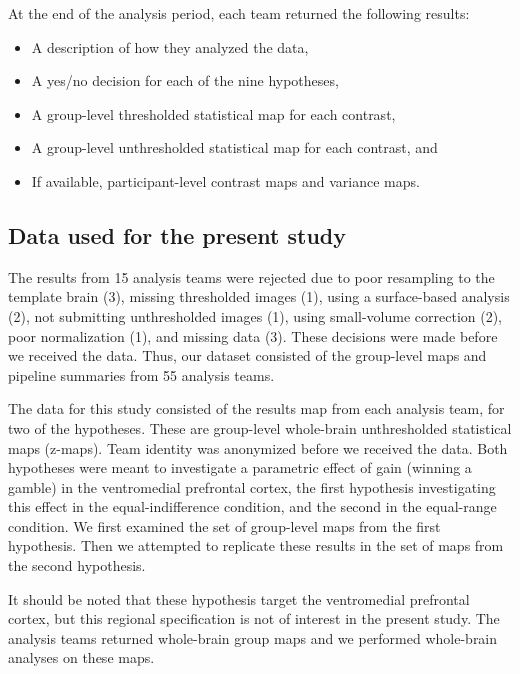 \documentclass[a4paper,doc,natbib]{apa6}
\begin{document}
At the end of the analysis period, each team returned the following results:
\begin{itemize}
	\item A description of how they analyzed the data,
	\item A yes/no decision for each of the nine hypotheses, 
	\item A group-level thresholded statistical map for each contrast, 
	\item A group-level unthresholded statistical map for each contrast, and
	\item If available, participant-level contrast maps and variance maps. 
\end{itemize}

\subsection{Data used for the present study}
The results from 15 analysis teams were rejected due to poor resampling to the template brain (3), missing thresholded images (1), using a surface-based analysis (2), not submitting unthresholded images (1), using small-volume correction (2),  poor normalization (1), and missing data (3). These decisions were made before we received the data. Thus, our dataset consisted of the group-level maps and pipeline summaries from 55 analysis teams. 

The data for this study consisted of the results map from each analysis team, for two of the hypotheses. These are group-level whole-brain unthresholded statistical maps (z-maps). Team identity was anonymized before we received the data. Both hypotheses were meant to investigate a parametric effect of gain (winning a gamble) in the ventromedial prefrontal cortex, the first hypothesis investigating this effect in the equal-indifference condition, and the second in the equal-range condition. We first examined the set of group-level maps from the first hypothesis. Then we attempted to replicate these results in the set of maps from the second hypothesis. 

It should be noted that these hypothesis target the ventromedial prefrontal cortex, but this regional specification is not of interest in the present study. The analysis teams returned whole-brain group maps and we performed whole-brain analyses on these maps. 
\end{document}

